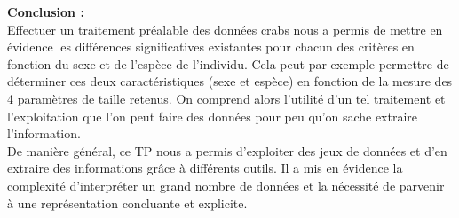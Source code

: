 ﻿\documentclass[a4paper, 9pt]{article}
\begin{document}
\textbf{Conclusion :}\\
Effectuer un traitement préalable des données crabs nous a permis de mettre en évidence les différences significatives existantes pour chacun des critères en fonction du sexe et de l’espèce de l’individu. Cela peut par exemple permettre de déterminer ces deux caractéristiques (sexe et espèce) en fonction de la mesure des 4 paramètres de taille retenus. On comprend alors l’utilité d’un tel traitement et l’exploitation que l’on peut faire des données pour peu qu’on sache extraire l’information. 
\\ De manière général, ce TP nous a permis d’exploiter des jeux de données et d’en extraire des informations grâce à différents outils. Il a mis en évidence la complexité d’interpréter un grand nombre de données et la nécessité de parvenir à une représentation concluante et explicite.
\end{document}
